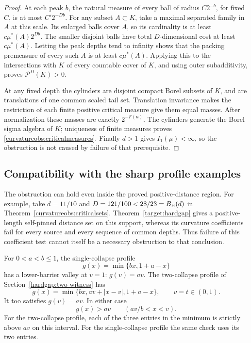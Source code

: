 \begin{proof}
At each peak \(b\), the natural measure of every ball of radius
\(C2^{-b}\), for fixed \(C\), is at most \(C'2^{-Db}\).
For any subset \(A\subset K\), take a maximal separated family in
\(A\) at this scale. Its enlarged balls cover \(A\), so its
cardinality is at least \(c\mu^*(A)2^{Db}\). The smaller disjoint
balls have total \(D\)-dimensional cost at least \(c\mu^*(A)\).
Letting the peak depths tend to infinity shows that the packing
premeasure of every such \(A\) is at least \(c\mu^*(A)\).
Applying this to the intersections with \(K\) of every countable
cover of \(K\), and using outer subadditivity, proves
\(\mathcal P^D(K)>0\).

At any fixed depth the cylinders are disjoint compact Borel subsets
of \(K\), and are translations of one common scaled tail set.
Translation invariance makes the restriction of each finite positive
critical measure give them equal masses. After normalization these
masses are exactly \(2^{-F(n)}\). The cylinders generate the Borel
sigma algebra of \(K\); uniqueness of finite measures proves
\eqref{curvatureobs:criticalmeasures}. Finally \(d>1\) gives
\(I_1(\mu)<\infty\), so the obstruction is not caused by failure of
that prerequisite.
\end{proof}

\subsection{Compatibility with the sharp profile examples}

The obstruction can hold even inside the proved positive-distance region.
For example, take \(d=11/10\) and \(D=121/100<28/23=B_{\rm H}(d)\)
in Theorem~\ref{curvatureobs:criticalsets}.
Theorem~\ref{target:hardgap} gives a positive-length self-pinned distance
set on this support, whereas its curvature coefficients fail for every
source and every sequence of common depths. Thus failure of this
coefficient test cannot itself be a necessary obstruction to that conclusion.

For \(0<a<b\le1\), the single-collapse profile
\[
 g(x)=\min\{bx,1+a-x\}
\]
has a lower-barrier valley at \(v=1\): \(g(v)=av\).
The two-collapse profile of Section~\ref{hardgap:two-witness} has
\[
 g(x)=\min\{bx,av+|x-v|,1+a-x\},\qquad v=t\in(0,1).
\]
It too satisfies \(g(v)=av\). In either case
\begin{equation}\label{curvatureobs:valley}
 g(x)>av\qquad(av/b<x<v).
\end{equation}
For the two-collapse profile, each of the three entries in the minimum
is strictly above \(av\) on this interval. For the single-collapse
profile the same check uses its two entries.

